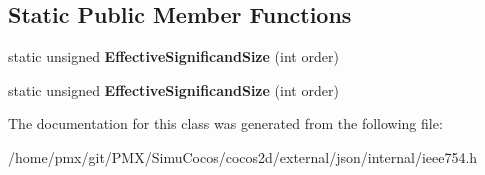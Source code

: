 \subsection*{Static Public Member Functions}
\begin{DoxyCompactItemize}
\item 
\mbox{\label{classinternal_1_1Double_a980c26d006068b23406805e9b0e02588}} 
static unsigned {\bfseries Effective\+Significand\+Size} (int order)
\item 
\mbox{\label{classinternal_1_1Double_a980c26d006068b23406805e9b0e02588}} 
static unsigned {\bfseries Effective\+Significand\+Size} (int order)
\end{DoxyCompactItemize}


The documentation for this class was generated from the following file\+:\begin{DoxyCompactItemize}
\item 
/home/pmx/git/\+P\+M\+X/\+Simu\+Cocos/cocos2d/external/json/internal/ieee754.\+h\end{DoxyCompactItemize}
